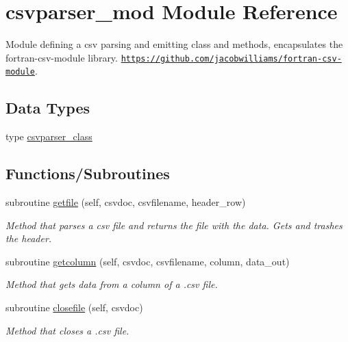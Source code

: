 \hypertarget{namespacecsvparser__mod}{}\section{csvparser\+\_\+mod Module Reference}
\label{namespacecsvparser__mod}


Module defining a csv parsing and emitting class and methods, encapsulates the fortran-\/csv-\/module library. \href{https://github.com/jacobwilliams/fortran-csv-module}{\tt https\+://github.\+com/jacobwilliams/fortran-\/csv-\/module}.  


\subsection*{Data Types}
\begin{DoxyCompactItemize}
\item 
type \mbox{\hyperlink{structcsvparser__mod_1_1csvparser__class}{csvparser\+\_\+class}}
\end{DoxyCompactItemize}
\subsection*{Functions/\+Subroutines}
\begin{DoxyCompactItemize}
\item 
subroutine \mbox{\hyperlink{namespacecsvparser__mod_aa200ea4f5e06c67f7a627af0a70450a6}{getfile}} (self, csvdoc, csvfilename, header\+\_\+row)
\begin{DoxyCompactList}\small\item\em Method that parses a csv file and returns the file with the data. Gets and trashes the header. \end{DoxyCompactList}\item 
subroutine \mbox{\hyperlink{namespacecsvparser__mod_ae966faafebb8c4035e12e0bb24de717c}{getcolumn}} (self, csvdoc, csvfilename, column, data\+\_\+out)
\begin{DoxyCompactList}\small\item\em Method that gets data from a column of a .csv file. \end{DoxyCompactList}\item 
subroutine \mbox{\hyperlink{namespacecsvparser__mod_a8f56a69c948d139a3e9c88476f25305d}{closefile}} (self, csvdoc)
\begin{DoxyCompactList}\small\item\em Method that closes a .csv file. \end{DoxyCompactList}\end{DoxyCompactItemize}
